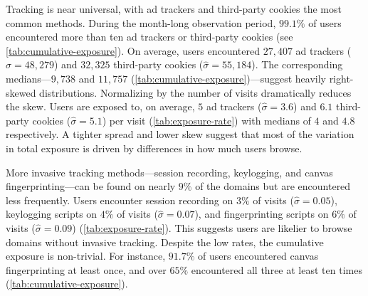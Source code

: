 \documentclass[12pt, letterpaper]{article}
\begin{document}
Tracking is near universal, with ad trackers and third-party cookies the most common methods. During the month-long observation period, $99.1\%$ of users encountered more than ten ad trackers or third-party cookies  (see \cref{tab:cumulative-exposure}). On average, users encountered $27{,}407$ ad trackers ($\hat{\sigma} = 48{,}279$) and $32{,}325$ third-party cookies ($\hat{\sigma} = 55{,}184$). The corresponding medians---$9{,}738$ and $11{,}757$ (\cref{tab:cumulative-exposure})---suggest heavily right-skewed distributions. Normalizing by the number of visits dramatically reduces the skew. Users are exposed to, on average, $5$ ad trackers ($\hat{\sigma} = 3.6$) and $6.1$ third-party cookies ($\hat{\sigma} = 5.1$) per visit (\cref{tab:exposure-rate}) with medians of $4$ and $4.8$ respectively. A tighter spread and lower skew suggest that most of the variation in total exposure is driven by differences in how much users browse. 

More invasive tracking methods---session recording, keylogging, and canvas fingerprinting---can be found on nearly $9\%$ of the domains but are encountered less frequently. Users encounter session recording on $3\%$ of visits ($\hat{\sigma} = 0.05$), keylogging scripts on $4\%$ of visits ($\hat{\sigma} = 0.07$), and fingerprinting scripts on $6\%$ of visits ($\hat{\sigma} = 0.09$) (\cref{tab:exposure-rate}). This suggests users are likelier to browse domains without invasive tracking. Despite the low rates, the cumulative exposure is non-trivial. For instance, $91.7\%$ of users encountered canvas fingerprinting at least once, and over $65\%$ encountered all three at least ten times (\cref{tab:cumulative-exposure}).
\end{document}

